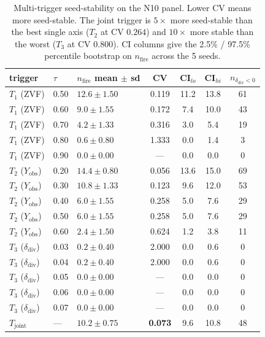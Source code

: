 \documentclass{article}
\begin{document}
\begin{table}[t]
\centering\small
\caption{Multi-trigger seed-stability on the N10 panel.  Lower CV
means more seed-stable.  The joint trigger is $5\times$ more
seed-stable than the best single axis ($T_2$ at CV $0.264$) and
$10\times$ more stable than the worst ($T_3$ at CV $0.800$).  CI
columns give the 2.5\% / 97.5\% percentile bootstrap on
$n_{\mathrm{fire}}$ across the 5 seeds.}
\label{tab:p7-multitrigger-seed}
\begin{tabular}{lllcccc}
\toprule
trigger & $\tau$ & $n_{\mathrm{fire}}$ mean $\pm$ sd & CV &
CI$_{lo}$ & CI$_{hi}$ & $n_{\delta_{\mathrm{div}}{<}0}$ \\
\midrule
$T_1$ (ZVF)      & 0.50 & $12.6 \pm 1.50$ & 0.119 & 11.2 & 13.8 & 61 \\
$T_1$ (ZVF)      & 0.60 & $ 9.0 \pm 1.55$ & 0.172 &  7.4 & 10.0 & 43 \\
$T_1$ (ZVF)      & 0.70 & $ 4.2 \pm 1.33$ & 0.316 &  3.0 &  5.4 & 19 \\
$T_1$ (ZVF)      & 0.80 & $ 0.6 \pm 0.80$ & 1.333 &  0.0 &  1.4 &  3 \\
$T_1$ (ZVF)      & 0.90 & $ 0.0 \pm 0.00$ &  ---  &  0.0 &  0.0 &  0 \\
\midrule
$T_2$ ($Y_{\mathrm{obs}}$) & 0.20 & $14.4 \pm 0.80$ & 0.056 & 13.6 & 15.0 & 69 \\
$T_2$ ($Y_{\mathrm{obs}}$) & 0.30 & $10.8 \pm 1.33$ & 0.123 &  9.6 & 12.0 & 53 \\
$T_2$ ($Y_{\mathrm{obs}}$) & 0.40 & $ 6.0 \pm 1.55$ & 0.258 &  5.0 &  7.6 & 29 \\
$T_2$ ($Y_{\mathrm{obs}}$) & 0.50 & $ 6.0 \pm 1.55$ & 0.258 &  5.0 &  7.6 & 29 \\
$T_2$ ($Y_{\mathrm{obs}}$) & 0.60 & $ 2.4 \pm 1.50$ & 0.624 &  1.2 &  3.8 & 11 \\
\midrule
$T_3$ ($\delta_{\mathrm{div}}$) & 0.03 & $0.2 \pm 0.40$ & 2.000 & 0.0 & 0.6 &  0 \\
$T_3$ ($\delta_{\mathrm{div}}$) & 0.04 & $0.2 \pm 0.40$ & 2.000 & 0.0 & 0.6 &  0 \\
$T_3$ ($\delta_{\mathrm{div}}$) & 0.05 & $0.0 \pm 0.00$ &  ---  & 0.0 & 0.0 &  0 \\
$T_3$ ($\delta_{\mathrm{div}}$) & 0.06 & $0.0 \pm 0.00$ &  ---  & 0.0 & 0.0 &  0 \\
$T_3$ ($\delta_{\mathrm{div}}$) & 0.07 & $0.0 \pm 0.00$ &  ---  & 0.0 & 0.0 &  0 \\
\midrule
$T_{\mathrm{joint}}$ & --- & $10.2 \pm 0.75$ & \textbf{0.073} & 9.6 & 10.8 & 48 \\
\bottomrule
\end{tabular}
\end{table}
\end{document}
